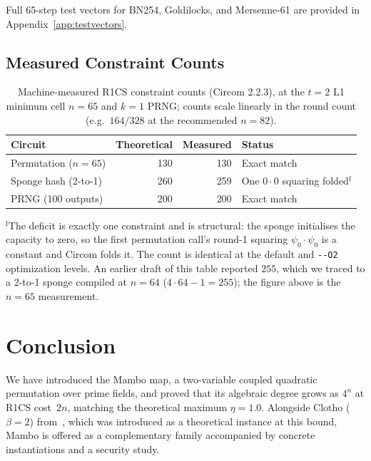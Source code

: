 \documentclass[11pt,a4paper]{article}
\theoremstyle{definition}
\begin{document}
Full 65-step test vectors for BN254, Goldilocks, and Mersenne-61 are
provided in Appendix~\ref{app:testvectors}.


\subsection{Measured Constraint Counts}\label{sec:impl:constraints}

\begin{table}[h]
\centering
\caption{Machine-measured R1CS constraint counts (Circom 2.2.3), at
the $t=2$ L1 minimum cell $n=65$ and $k=1$ PRNG; counts scale
linearly in the round count (e.g.\ $164/328$ at the recommended
$n=82$).}
\label{tab:measured}
\begin{tabular}{@{}lrrl@{}}
\toprule
Circuit & Theoretical & Measured & Status \\
\midrule
Permutation ($n=65$)  & 130 & 130 & Exact match \\
Sponge hash (2-to-1)  & 260 & 259 & One $0\!\cdot\!0$ squaring folded$^{\mathrm{f}}$ \\
PRNG (100 outputs)    & 200 & 200 & Exact match \\
\bottomrule
\end{tabular}
\smallskip

\footnotesize
$^{\mathrm{f}}$The deficit is exactly one constraint and is
structural: the sponge initialises the capacity to zero, so the
first permutation call's round-1 squaring $\psi_0 \cdot \psi_0$ is a
constant and Circom folds it. The count is identical at the default
and \texttt{-{}-O2} optimization levels. An earlier draft of this
table reported $255$, which we traced to a 2-to-1 sponge compiled at
$n = 64$ ($4 \cdot 64 - 1 = 255$); the figure above is the $n = 65$
measurement.
\end{table}


\section{Conclusion}\label{sec:conclusion}

We have introduced the Mambo map, a two-variable coupled quadratic
permutation over prime fields, and proved that its algebraic degree grows as
$4^n$ at R1CS cost~$2n$, matching the theoretical maximum
$\eta = 1.0$. Alongside Clotho ($\beta=2$) from~\cite{ALFOMs}, which was
introduced as a theoretical instance at this bound, Mambo is offered as
a complementary family accompanied by concrete instantiations and a
security study.
\end{document}
